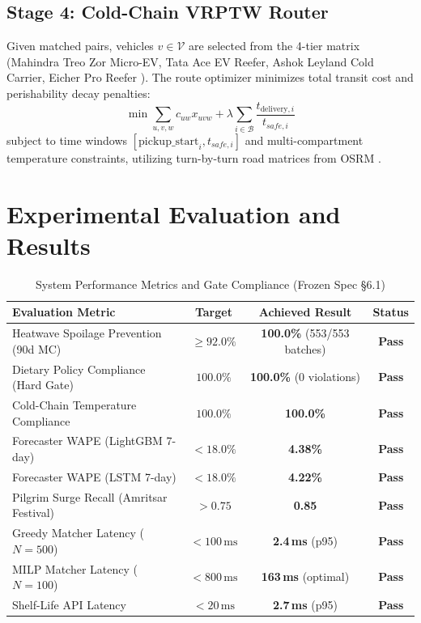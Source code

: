 \documentclass[11pt,a4paper]{article}
\begin{document}
\subsection{Stage 4: Cold-Chain VRPTW Router}
Given matched pairs, vehicles $v \in \mathcal{V}$ are selected from the 4-tier matrix (Mahindra Treo Zor Micro-EV, Tata Ace EV Reefer, Ashok Leyland Cold Carrier, Eicher Pro Reefer \cite{tataaceevspec,ashokleylandspec}).
The route optimizer minimizes total transit cost and perishability decay penalties:
\begin{equation}
    \min \sum_{u, v, w} c_{uw} x_{uvw} + \lambda \sum_{i \in \mathcal{B}} \frac{t_{\text{delivery}, i}}{t_{safe, i}}
\end{equation}
subject to time windows $[\text{pickup\_start}_i, t_{safe, i}]$ and multi-compartment temperature constraints, utilizing turn-by-turn road matrices from OSRM \cite{osm2024,osrm2024}.

\section{Experimental Evaluation and Results}

\begin{table}[ht]
\centering
\caption{System Performance Metrics and Gate Compliance (Frozen Spec \S6.1)}
\label{tab:kpi}
\begin{tabular}{@{}lccc@{}}
\toprule
\textbf{Evaluation Metric} & \textbf{Target} & \textbf{Achieved Result} & \textbf{Status} \\
\midrule
Heatwave Spoilage Prevention (90d MC) & $\ge 92.0\%$ & \textbf{100.0\%} (553/553 batches) & \textbf{Pass} \\
Dietary Policy Compliance (Hard Gate) & $100.0\%$ & \textbf{100.0\%} (0 violations) & \textbf{Pass} \\
Cold-Chain Temperature Compliance & $100.0\%$ & \textbf{100.0\%} & \textbf{Pass} \\
Forecaster WAPE (LightGBM 7-day) & $< 18.0\%$ & \textbf{4.38\%} & \textbf{Pass} \\
Forecaster WAPE (LSTM 7-day) & $< 18.0\%$ & \textbf{4.22\%} & \textbf{Pass} \\
Pilgrim Surge Recall (Amritsar Festival) & $> 0.75$ & \textbf{0.85} & \textbf{Pass} \\
Greedy Matcher Latency ($N=500$) & $< 100\,\text{ms}$ & \textbf{2.4\,ms} (p95) & \textbf{Pass} \\
MILP Matcher Latency ($N=100$) & $< 800\,\text{ms}$ & \textbf{163\,ms} (optimal) & \textbf{Pass} \\
Shelf-Life API Latency & $< 20\,\text{ms}$ & \textbf{2.7\,ms} (p95) & \textbf{Pass} \\
\bottomrule
\end{tabular}
\end{table}
\end{document}

